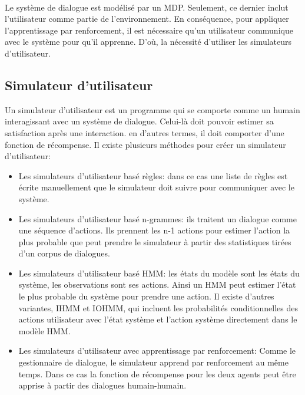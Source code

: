 \paragraph{}
Le système de dialogue est modélisé par un MDP. Seulement, ce dernier inclut l’utilisateur comme partie de l’environnement. En conséquence, pour appliquer l’apprentissage par renforcement, il est nécessaire qu’un utilisateur communique avec le système pour qu’il apprenne. D’où, la nécessité d’utiliser les simulateurs d’utilisateur.

\subsection{Simulateur d'utilisateur}
Un simulateur d’utilisateur est un programme qui se comporte comme un humain interagissant avec un système de dialogue. Celui-là doit pouvoir estimer sa satisfaction après une interaction. en d’autres termes, il doit comporter d'une fonction de récompense. Il existe plusieurs méthodes pour créer un simulateur d’utilisateur:
\begin{itemize}
	\item Les simulateurs d’utilisateur basé règles: dans ce cas une liste de règles est écrite manuellement que le simulateur doit suivre pour communiquer avec le système\cite{Schatzmann2007}.
	\item Les simulateurs d’utilisateur basé n-grammes: ils traitent un dialogue comme une séquence d’actions. Ils prennent les n-1 actions pour estimer l’action la plus probable que peut prendre le simulateur à partir des statistiques tirées d'un	 corpus de dialogues\cite{Georgila2005}.
	\item Les simulateurs d’utilisateur basé HMM: les états du modèle sont les états du système, les observations sont ses actions. Ainsi un HMM peut estimer l’état le plus probable du système pour prendre une action. Il existe d’autres variantes, IHMM et IOHMM, qui incluent les probabilités conditionnelles des actions utilisateur avec l’état système et l’action système directement dans le modèle HMM\cite{Cuayhuitl2005}.
	\item Les simulateurs d’utilisateur avec apprentissage par renforcement: Comme le gestionnaire de dialogue, le simulateur apprend par renforcement au même temps. Dans ce cas la fonction de récompense pour les deux agents peut être apprise à partir des dialogues humain-humain\cite{Chandramohan2011}.
\end{itemize}







